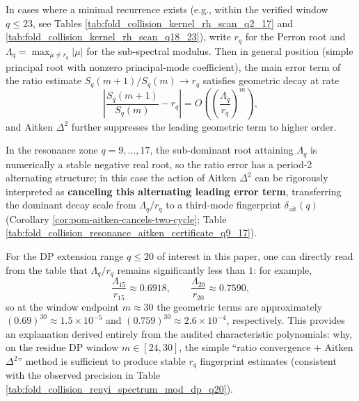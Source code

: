 \begin{remark}\label{rem:pom-dp-window-spectral-gap}
In cases where a minimal recurrence exists (e.g., within the verified window \(q\le 23\), see Tables \ref{tab:fold_collision_kernel_rh_scan_q2_17} and \ref{tab:fold_collision_kernel_rh_scan_q18_23}), write \(r_q\) for the Perron root and \(\Lambda_q=\max_{\mu\ne r_q}|\mu|\) for the sub-spectral modulus.
Then in general position (simple principal root with nonzero principal-mode coefficient), the main error term of the ratio estimate \(S_q(m+1)/S_q(m)\to r_q\) satisfies geometric decay at rate
\[
\left|\frac{S_q(m+1)}{S_q(m)}-r_q\right|=O\!\left(\left(\frac{\Lambda_q}{r_q}\right)^{m}\right),
\]
and Aitken \(\Delta^2\) further suppresses the leading geometric term to higher order.
\par
In the resonance zone \(q=9,\dots,17\), the sub-dominant root attaining \(\Lambda_q\) is numerically a stable negative real root, so the ratio error has a period-2 alternating structure; in this case the action of Aitken \(\Delta^2\) can be rigorously interpreted as \textbf{canceling this alternating leading error term}, transferring the dominant decay scale from \(\Lambda_q/r_q\) to a third-mode fingerprint \(\delta_{\mathrm{ait}}(q)\) (Corollary \ref{cor:pom-aitken-cancels-two-cycle}; Table \ref{tab:fold_collision_resonance_aitken_certificate_q9_17}).
\par
For the DP extension range \(q\le 20\) of interest in this paper, one can directly read from the table that \(\Lambda_q/r_q\) remains significantly less than \(1\): for example,
\[
\frac{\Lambda_{15}}{r_{15}}\approx 0.6918,\qquad
\frac{\Lambda_{20}}{r_{20}}\approx 0.7590,
\]
so at the window endpoint \(m\approx 30\) the geometric terms are approximately \((0.69)^{30}\approx 1.5\times 10^{-5}\) and \((0.759)^{30}\approx 2.6\times 10^{-4}\), respectively.
This provides an explanation derived entirely from the audited characteristic polynomials: why, on the residue DP window \(m\in[24,30]\), the simple ``ratio convergence + Aitken \(\Delta^2\)'' method is sufficient to produce stable \(r_q\) fingerprint estimates (consistent with the observed precision in Table \ref{tab:fold_collision_renyi_spectrum_mod_dp_q20}).
\end{remark}


